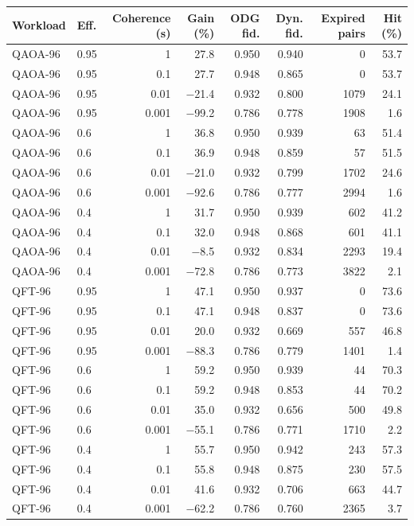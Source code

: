 \begin{tabular}{llrrrrrr}
\toprule
Workload & Eff. & Coherence (s) & Gain (\%) & ODG fid. & Dyn. fid. & Expired pairs & Hit (\%) \\
\midrule
QAOA-96 & 0.95 & 1 & 27.8 & 0.950 & 0.940 & 0 & 53.7 \\
QAOA-96 & 0.95 & 0.1 & 27.7 & 0.948 & 0.865 & 0 & 53.7 \\
QAOA-96 & 0.95 & 0.01 & $-$21.4 & 0.932 & 0.800 & 1079 & 24.1 \\
QAOA-96 & 0.95 & 0.001 & $-$99.2 & 0.786 & 0.778 & 1908 & 1.6 \\
QAOA-96 & 0.6 & 1 & 36.8 & 0.950 & 0.939 & 63 & 51.4 \\
QAOA-96 & 0.6 & 0.1 & 36.9 & 0.948 & 0.859 & 57 & 51.5 \\
QAOA-96 & 0.6 & 0.01 & $-$21.0 & 0.932 & 0.799 & 1702 & 24.6 \\
QAOA-96 & 0.6 & 0.001 & $-$92.6 & 0.786 & 0.777 & 2994 & 1.6 \\
QAOA-96 & 0.4 & 1 & 31.7 & 0.950 & 0.939 & 602 & 41.2 \\
QAOA-96 & 0.4 & 0.1 & 32.0 & 0.948 & 0.868 & 601 & 41.1 \\
QAOA-96 & 0.4 & 0.01 & $-$8.5 & 0.932 & 0.834 & 2293 & 19.4 \\
QAOA-96 & 0.4 & 0.001 & $-$72.8 & 0.786 & 0.773 & 3822 & 2.1 \\
QFT-96 & 0.95 & 1 & 47.1 & 0.950 & 0.937 & 0 & 73.6 \\
QFT-96 & 0.95 & 0.1 & 47.1 & 0.948 & 0.837 & 0 & 73.6 \\
QFT-96 & 0.95 & 0.01 & 20.0 & 0.932 & 0.669 & 557 & 46.8 \\
QFT-96 & 0.95 & 0.001 & $-$88.3 & 0.786 & 0.779 & 1401 & 1.4 \\
QFT-96 & 0.6 & 1 & 59.2 & 0.950 & 0.939 & 44 & 70.3 \\
QFT-96 & 0.6 & 0.1 & 59.2 & 0.948 & 0.853 & 44 & 70.2 \\
QFT-96 & 0.6 & 0.01 & 35.0 & 0.932 & 0.656 & 500 & 49.8 \\
QFT-96 & 0.6 & 0.001 & $-$55.1 & 0.786 & 0.771 & 1710 & 2.2 \\
QFT-96 & 0.4 & 1 & 55.7 & 0.950 & 0.942 & 243 & 57.3 \\
QFT-96 & 0.4 & 0.1 & 55.8 & 0.948 & 0.875 & 230 & 57.5 \\
QFT-96 & 0.4 & 0.01 & 41.6 & 0.932 & 0.706 & 663 & 44.7 \\
QFT-96 & 0.4 & 0.001 & $-$62.2 & 0.786 & 0.760 & 2365 & 3.7 \\
\bottomrule
\end{tabular}
